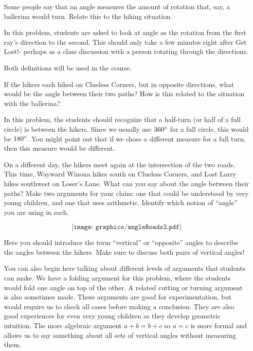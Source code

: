 \documentclass{ximera}
\begin{document}
\begin{problem}
Some people say that an angle measures the amount of rotation that, say, a ballerina would turn. Relate this to the hiking situation.
\begin{instructorNotes}
     In this problem, students are asked to look at angle as the rotation from the first ray's direction to the second.  This should only take a few minutes right after Get Lost!- perhaps as a class discussion with a person rotating through the directions.
     
    Both definitions will be used in the course.
\end{instructorNotes}
\end{problem}   

\newpage

\begin{problem}
If the hikers each hiked on Clueless Corners, but in opposite directions, what would be the angle between their two paths?  How is this related to the situation with the ballerina?

\begin{instructorNotes}
In this problem, the students should recognize that a half-turn (or half of a full circle) is between the hikers.  Since we usually use $360\degree$ for a full circle, this would be $180\degree$.  You might point out that if we chose a different measure for a full turn, then this measure would be different.
\end{instructorNotes}
\end{problem}


\begin{problem}
On a different day, the hikers meet again at the intersection of the two roads.  This time, Wayward Winona hikes south on Clueless Corners, and Lost Larry hikes southwest on Loser's Lane.  What can you say about the angle between their paths?  Make two arguments for your claim: one that could be understood by very young children, and one that uses arithmetic.  Identify which notion of ``angle'' you are using in each.

\[
\texttt{[image: graphics/angleRoads2.pdf]}
\]

\begin{instructorNotes}
Here you should introduce the term ``vertical'' or ``opposite'' angles to describe the angles between the hikers.  Make sure to discuss both pairs of vertical angles!

You can also begin here talking about different levels of arguments that students can make.  We have a folding argument for this problem, where the students would fold one angle on top of the other.  A related cutting or turning argument is also sometimes made.  These arguments are good for experimentation, but would require us to check all cases before making a conclusion.  They are also good experiences for even very young children as they develop geometric intuition.  The more algebraic argument $a+b = b+c$ so $a = c$ is more formal and allows us to say something about all sets of vertical angles without measuring them.
\end{instructorNotes}
\end{problem}
\end{document}
